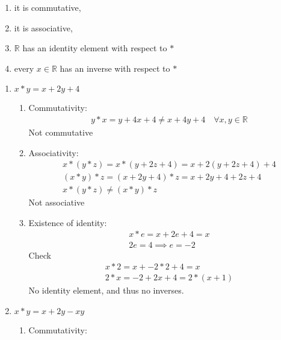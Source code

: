 \documentclass[nohyper,nobib]{tufte-handout}
\theoremstyle{definition}
\theoremstyle{remark}
\begin{document}
\begin{enumerate}[I]
    \item it is commutative,
    \item it is associative,
    \item $\mathbb{R}$ has an identity element with respect to $*$
    \item every $x \in \mathbb{R}$ has an inverse with respect to $*$
\end{enumerate}

\begin{enumerate}
    \item $x * y = x + 2y + 4$
        \begin{enumerate}[I]
            \item Commutativity:
                \begin{align}
                    &y * x = y + 4x + 4 \neq x + 4y + 4 \quad\forall x,y \in \mathbb{R}
                \end{align}
                Not commutative
            \item Associativity:
                \begin{align}
                    &x * (y * z) = x * (y + 2z +4)  = x + 2(y + 2z + 4) + 4 \nonumber \\
                    &(x * y) * z = (x + 2y + 4) * z = x + 2y + 4 + 2z + 4 \nonumber \\
                    &x * (y * z) \neq (x * y) * z
                \end{align}
                Not associative
            \item Existence of identity:
                \begin{align}
                    &x * e = x + 2e + 4 = x \nonumber \\
                    &2e = 4 \implies e = -2
                \end{align}
                Check
                \begin{align}
                    &x * 2 = x + -2*2 + 4 = x \nonumber \\ 
                    &2 * x = -2 + 2x + 4  = 2 * (x + 1)
                \end{align}
                No identity element, and thus no inverses.
        \end{enumerate}
    \item $x * y = x + 2y - xy$
        \begin{enumerate}[I]
            \item Commutativity:

\end{enumerate}
\end{enumerate}
\end{document}
